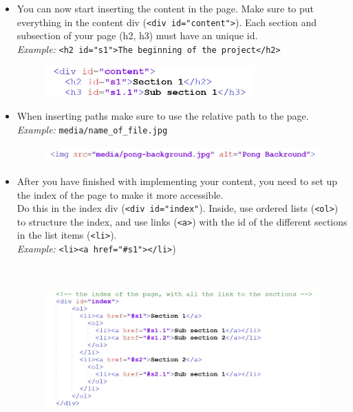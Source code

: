 \documentclass{article}
\begin{document}
\begin{itemize}
    \item You can now start inserting the content in the page. Make sure to put everything in the content div (\colorbox{grey!7}{\texttt{<div id="content">}}). Each section and subsection of your page (h2, h3) must have an unique id. \\
    \textit{Example: } \texttt{<h2 id="s1">The beginning of the project</h2>}
    \begin{figure}[h]
        \centering
        \includegraphics[height=1.2cm]{content.jpg}
    \end{figure}
    \pagebreak
    
    \item When inserting paths make sure to use the relative path to the page.\\
    \textit{Example:} \texttt{media/name\_of\_file.jpg}
    \begin{figure}[h]
        \centering
        \includegraphics[height=0.6cm]{imagee.jpg}
    \end{figure}
    
    \item After you have finished with implementing your content, you need to set up the index of the page to make it more accessible. \\
    Do this in the index div (\colorbox{grey!7}{\texttt{<div id="index"}}). Inside, use ordered lists (\colorbox{grey!7}{\texttt{<ol>}}) to structure the index, and use links (\colorbox{grey!7}{\texttt{<a>}}) with the id of the different sections in the list items (\colorbox{grey!7}{\texttt{<li>}}).\\
    \textit{Example:} \texttt{<li><a href="#s1"></li>})
    \begin{figure}[h]
        \centering
        \includegraphics[height=6.4cm]{index.jpg}
    \end{figure}
    

\end{itemize}
\end{document}
